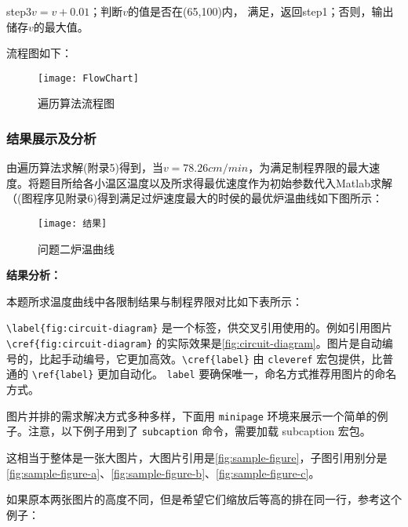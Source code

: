 \documentclass[withoutpreface,bwprint]{cumcmthesis} %
\numberwithin{equation}{subsection}
\newcommand{\toper}{\noindent \textbf}
\begin{document}
step3\quad $v=v+0.01$；判断$v$的值是否在(65,100)内， 满足，返回step1；否则，输出储存$v$的最大值。

\noindent 流程图如下：

\begin{figure}[!h]
	\centering
	\texttt{[image: FlowChart]}
	\caption{遍历算法流程图}
	\label{fig 8}
\end{figure}

\subsubsection{结果展示及分析}

由遍历算法求解(附录5)得到，当$v=78.26cm/min$，为满足制程界限的最大速度。将题目所给各小温区温度以及所求得最优速度作为初始参数代入Matlab求解（(图程序见附录6)得到满足过炉速度最大的时侯的最优炉温曲线如下图所示：

\begin{figure}[!h]
	\centering
	\texttt{[image: 结果]}
	\caption{问题二炉温曲线}
	\label{fig 9}
\end{figure}

\toper {结果分析：}

本题所求温度曲线中各限制结果与制程界限对比如下表所示：









\verb|\label{fig:circuit-diagram}| 是一个标签，供交叉引用使用的。例如引用图片 \verb|\cref{fig:circuit-diagram}| 的实际效果是\cref{fig:circuit-diagram}。图片是自动编号的，比起手动编号，它更加高效。\verb|\cref{label}| 由 \verb|cleveref| 宏包提供，比普通的 \verb|\ref{label}| 更加自动化。 \verb|label| 要确保唯一，命名方式推荐用图片的命名方式。

图片并排的需求解决方式多种多样，下面用 \verb|minipage| 环境来展示一个简单的例子。注意，以下例子用到了 \verb|subcaption| 命令，需要加载 subcaption 宏包。


这相当于整体是一张大图片，大图片引用是\cref{fig:sample-figure}，子图引用别分是\cref{fig:sample-figure-a}、\cref{fig:sample-figure-b}、\cref{fig:sample-figure-c}。

如果原本两张图片的高度不同，但是希望它们缩放后等高的排在同一行，参考这个例子：
\end{document}

